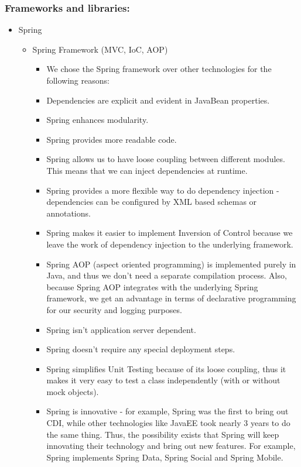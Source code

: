 \subsubsection{Frameworks and libraries:}
\begin{itemize}
	\item Spring
		\begin{itemize}
			\item Spring Framework (MVC, IoC, AOP)
				\begin{itemize}
					\item We chose the Spring framework over other technologies for the following reasons:
					\item Dependencies are explicit and evident in JavaBean properties.
					\item Spring enhances modularity.
					\item Spring provides more readable code.
					\item Spring allows us to have loose coupling between different modules. This means that we can inject dependencies at runtime.
					\item Spring provides a more flexible way to do dependency injection - dependencies can be configured by XML based schemas or annotations.
					\item Spring makes it easier to implement Inversion of Control because we leave the work of dependency injection to the underlying framework.
					\item Spring AOP (aspect oriented programming) is implemented purely in Java, and thus we don't need a separate compilation process. Also, because Spring AOP integrates with the underlying Spring framework, we get an advantage in terms of declarative programming for our security and logging purposes.
					\item Spring isn't application server dependent.
					\item Spring doesn't require any special deployment steps.
					\item Spring simplifies Unit Testing because of its loose coupling, thus it makes it very easy to test a class independently (with or without mock objects).
					\item Spring is innovative - for example, Spring was the first to bring out CDI, while other technologies like JavaEE took nearly 3 years to do the same thing. Thus, the possibility exists that Spring will keep innovating their technology and bring out new features. For example, Spring implements Spring Data, Spring Social and Spring Mobile.

\end{itemize}
\end{itemize}
\end{itemize}
